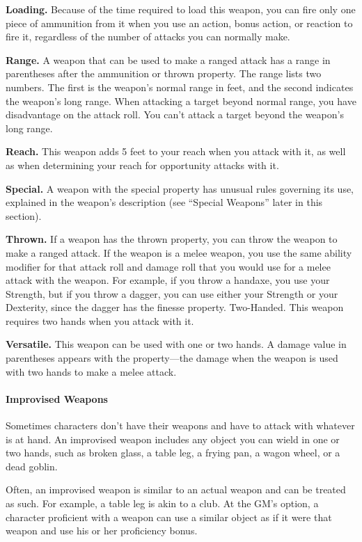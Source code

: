 \documentclass[
]{article}
\begin{document}
\textbf{Loading.} Because of the time required to load this weapon, you
can fire only one piece of ammunition from it when you use an action,
bonus action, or reaction to fire it, regardless of the number of
attacks you can normally make.

\textbf{Range.} A weapon that can be used to make a ranged attack has a
range in parentheses after the ammunition or thrown property. The range
lists two numbers. The first is the weapon's normal range in feet, and
the second indicates the weapon's long range. When attacking a target
beyond normal range, you have disadvantage on the attack roll. You can't
attack a target beyond the weapon's long range.

\textbf{Reach.} This weapon adds 5 feet to your reach when you attack
with it, as well as when determining your reach for opportunity attacks
with it.

\textbf{Special.} A weapon with the special property has unusual rules
governing its use, explained in the weapon's description (see ``Special
Weapons'' later in this section).

\textbf{Thrown.} If a weapon has the thrown property, you can throw the
weapon to make a ranged attack. If the weapon is a melee weapon, you use
the same ability modifier for that attack roll and damage roll that you
would use for a melee attack with the weapon. For example, if you throw
a handaxe, you use your Strength, but if you throw a dagger, you can use
either your Strength or your Dexterity, since the dagger has the finesse
property. Two-Handed. This weapon requires two hands when you attack
with it.

\textbf{Versatile.} This weapon can be used with one or two hands. A
damage value in parentheses appears with the property---the damage when
the weapon is used with two hands to make a melee attack.

\hypertarget{improvised-weapons}{%
\paragraph{Improvised Weapons}\label{improvised-weapons}}

Sometimes characters don't have their weapons and have to attack with
whatever is at hand. An improvised weapon includes any object you can
wield in one or two hands, such as broken glass, a table leg, a frying
pan, a wagon wheel, or a dead goblin.

Often, an improvised weapon is similar to an actual weapon and can be
treated as such. For example, a table leg is akin to a club. At the GM's
option, a character proficient with a weapon can use a similar object as
if it were that weapon and use his or her proficiency bonus.
\end{document}

